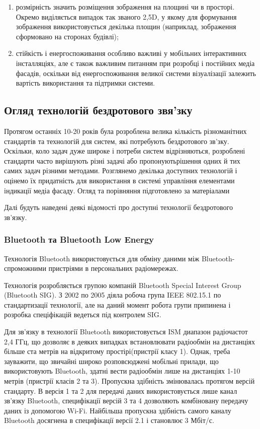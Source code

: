 \documentclass[a4paper,ukrainian,utf8,nocolumnsxix,floatsection,equationsection]{eskdtext}
\renewcommand\paragraph{\subsubsection}
\begin{document}
\begin{enumerate}
	\item розмірність значить розміщення зображення на площині чи в просторі. Окремо виділяється випадок так званого 2,5D, у якому для формування зображення використовується декілька площин (наприклад, зображення сформовано на сторонах будівлі);
	\item стійкість і енергоспоживання особливо важливі у мобільних інтерактивних інсталляціях, але є також важливим питанням при розробці і постійних медіа фасадів, оскільки від енергоспоживання великої системи візуалізації залежить вартість використання та підтримки системи.
\end{enumerate}


\subsection{Огляд технологій бездротового звя’зку}

Протягом останніх 10-20 років була розроблена велика кількість різноманітних стандартів та технологій для систем, які потребують бездротового зв’зку. Оскільки, коло задач дуже широке і потреби систем відрізняються, розроблені стандарти часто вирішують різні задачі або пропонуютьрішення одних й тих самих задач різними методами. Розглянемо декілька доступних технологій і оцінемо їх придатність для використання в системі управління елементами індикації медіа фасаду. Огляд та порівняння підготовлено за матеріалами


Далі будуть наведені деякі відомості про доступні технології бездротового зв’язку.

\paragraph{Bluetooth та Bluetooth Low Energy} %
\label{par:bluetooth_bluetooth_low_energy}

Технологія Bluetooth використовується для обміну даними між Bluetooth-спроможними пристріями в персональних радіомережах. 

Технологія розробляється групою компаній Bluetooth Special Interest Group (Bluetooth SIG). З 2002 по 2005 діяла робоча група IEEE 802.15.1 по стандартизації технології, але на даний момент робота групи припинена і розробка спеціфікацій ведеться під контролем SIG.

Для зв’язку в технології Bluetooth використовується ISM диапазон радіочастот 2,4 ГГц, що дозволяє в деяких випадках встановлювати радіообмін на дистанціях більше ста метрів на відкритому простірі(пристрії класу 1). Однак, треба зауважити, що звичайні широко розповсюджені мобільні прилади, що використовують Bluetooth, здатні вести радіообмін лише на дистанціях 1-10 метрів (пристрії класів 2 та 3). Пропускна здібність змінювалась протягом версій стандарту. В версія 1 та 2 для передачі даних використовується лише канал зв’язку Bluetooth, специфікації версій 3 та 4 дозволяють комбіновану передачу даних із допомогою Wi-Fi. Найбільша пропускна здібність самого каналу Bluetooth досягнена в специфікації версії 2.1 і становлює 3 Мбіт/с. 
\end{document}
